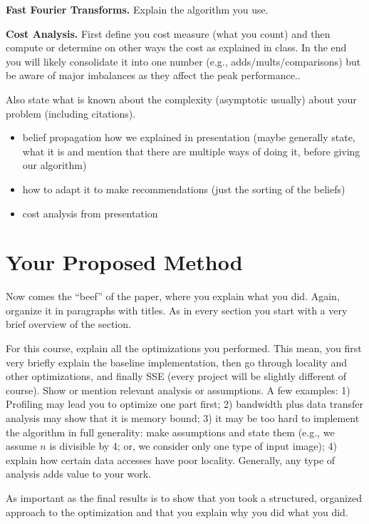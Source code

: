\documentclass[letterpaper]{article}
\newcommand{\mypar}[1]{{\bf #1.}}
\begin{document}
\mypar{Fast Fourier Transforms}
Explain the algorithm you use.

\mypar{Cost Analysis}
First define you cost measure (what you count) and then compute or determine on other ways the
cost as explained in class. In the end you will likely consolidate it into one number (e.g., adds/mults/comparisons) but be aware of major imbalances as they affect the peak performance..

Also state what is known about the complexity (asymptotic usually)
about your problem (including citations).

\begin{itemize}
\item belief propagation how we explained in presentation (maybe generally state, what it is and mention that there are multiple ways of doing it, before giving our algorithm)
\item how to adapt it to make recommendations (just the sorting of the beliefs)
\item cost analysis from presentation
\end{itemize}


\section{Your Proposed Method}\label{sec:yourmethod}

Now comes the ``beef'' of the paper, where you explain what you
did. Again, organize it in paragraphs with titles. As in every section
you start with a very brief overview of the section.

For this course, explain all the optimizations you performed. This mean, you first very briefly
explain the baseline implementation, then go through locality and other optimizations, and finally SSE (every project will be slightly different of course). Show or mention relevant analysis or assumptions. A few examples: 1) Profiling may lead you to optimize one part first; 2) bandwidth plus data transfer analysis may show that it is memory bound; 3) it may be too hard to implement the algorithm in full generality: make assumptions and state them (e.g., we assume $n$ is divisible by 4; or, we consider only one type of input image); 4) explain how certain data accesses have poor locality. Generally, any type of analysis adds value to your work.

As important as the final results is to show that you took a structured, organized approach to the optimization and that you explain why you did what you did.
\end{document}
